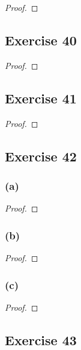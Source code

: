 \documentclass[14pt]{extarticle}
\begin{document}
\begin{proof}

\end{proof}

\subsection{Exercise 40}

\begin{proof}

\end{proof}

\subsection{Exercise 41}

\begin{proof}

\end{proof}

\subsection{Exercise 42}

\subsubsection{(a)}

\begin{proof}

\end{proof}

\subsubsection{(b)}

\begin{proof}

\end{proof}

\subsubsection{(c)}

\begin{proof}

\end{proof}

\subsection{Exercise 43}
\end{document}
